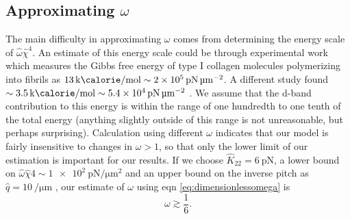 \documentclass[12pt]{article}
\begin{document}
\subsection{Approximating $\omega$}
The main difficulty in approximating $\omega$ comes from determining the energy scale of $\hat{\omega}\hat{\chi}^4$. An estimate of this energy scale could be through experimental work \cite{Kadler:1987ui} which measures the Gibbs free energy of type I collagen molecules polymerizing into fibrils as $\SI{13}{\kilo\calorie\per\mole}\sim\SI{2e5}{\pico\newton\per\micro\meter\squared}$. A different study found $\sim\SI{3.5}{\kilo\calorie\per\mole}\sim\SI{5.4e4}{\pico\newton\per\micro\meter\squared}$ \cite{Leikin:1995id}. We assume that the d-band contribution to this energy is within the range of one hundredth to one tenth of the total energy (anything slightly outside of this range is not unreasonable, but perhaps surprising). Calculation using different $\omega$ indicates that our model is fairly insensitive to changes in $\omega>1$, so that only the lower limit of our estimation is important for our results. If we choose $\hat{K}_{22}=\SI{6}{\pico\newton}$, a lower bound on $\hat{\omega}\hat{\chi}4\sim\SI{1e2}{\pico\newton\per\micro\meter\squared}$ and an upper bound on the inverse pitch as $\hat{q}=\SI{10}{\per\micro\meter}$ \cite{Cameron:2018kq}, our estimate of $\omega$ using eqn \ref{eq:dimensionlessomega} is
\begin{equation}\label{eq:omega}
\omega\gtrsim\frac{1}{6}.
\end{equation}
\end{document}
